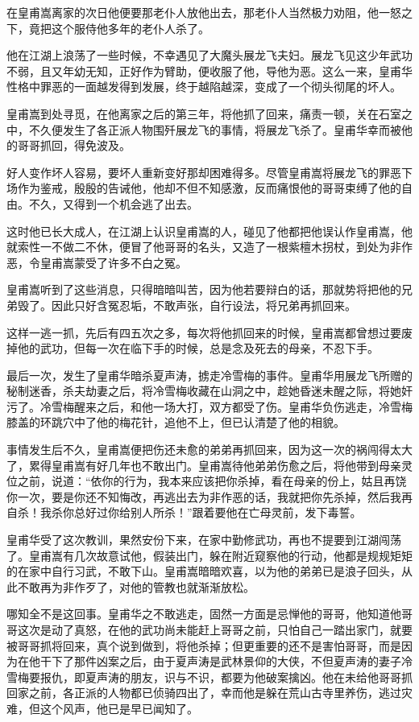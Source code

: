 \documentclass[12pt,oneside]{book}
\begin{document}
在皇甫嵩离家的次日他便要那老仆人放他出去，那老仆人当然极力劝阻，他一怒之下，竟把这个服侍他多年的老仆人杀了。

他在江湖上浪荡了一些时候，不幸遇见了大魔头展龙飞夫妇。展龙飞见这少年武功不弱，且又年幼无知，正好作为臂助，便收服了他，导他为恶。这么一来，皇甫华性格中罪恶的一面越发得到发展，终于越陷越深，变成了一个彻头彻尾的坏人。

皇甫嵩到处寻觅，在他离家之后的第三年，将他抓了回来，痛责一顿，关在石室之中，不久便发生了各正派人物围歼展龙飞的事情，将展龙飞杀了。皇甫华幸而被他的哥哥抓回，得免波及。

好人变作坏人容易，要坏人重新变好那却困难得多。尽管皇甫嵩将展龙飞的罪恶下场作为鉴戒，殷殷的告诫他，他却不但不知感激，反而痛恨他的哥哥束缚了他的自由。不久，又得到一个机会逃了出去。

这时他已长大成人，在江湖上认识皇甫嵩的人，碰见了他都把他误认作皇甫嵩，他就索性一不做二不休，便冒了他哥哥的名头，又造了一根紫檀木拐杖，到处为非作恶，令皇甫嵩蒙受了许多不白之冤。

皇甫嵩听到了这些消息，只得暗暗叫苦，因为他若要辩白的话，那就势将把他的兄弟毁了。因此只好含冤忍垢，不敢声张，自行设法，将兄弟再抓回来。

这样一逃一抓，先后有四五次之多，每次将他抓回来的时候，皇甫嵩都曾想过要废掉他的武功，但每一次在临下手的时候，总是念及死去的母亲，不忍下手。

最后一次，发生了皇甫华暗杀夏声涛，掳走冷雪梅的事件。皇甫华用展龙飞所赠的秘制迷香，杀夫劫妻之后，将冷雪梅收藏在山洞之中，趁她昏迷未醒之际，将她奸污了。冷雪梅醒来之后，和他一场大打，双方都受了伤。皇甫华负伤逃走，冷雪梅膝盖的环跳穴中了他的梅花针，追他不上，但已认清楚了他的相貌。

事情发生后不久，皇甫嵩便把伤还未愈的弟弟再抓回来，因为这一次的祸闯得太大了，累得皇甫嵩有好几年也不敢出门。皇甫嵩待他弟弟伤愈之后，将他带到母亲灵位之前，说道：``依你的行为，我本来应该把你杀掉，看在母亲的份上，姑且再饶你一次，要是你还不知悔改，再逃出去为非作恶的话，我就把你先杀掉，然后我再自杀！我杀你总好过你给别人所杀！''跟着要他在亡母灵前，发下毒誓。

皇甫华受了这次教训，果然安份下来，在家中勤修武功，再也不提要到江湖闯荡了。皇甫嵩有几次故意试他，假装出门，躲在附近窥察他的行动，他都是规规矩矩的在家中自行习武，不敢下山。皇甫嵩暗暗欢喜，以为他的弟弟已是浪子回头，从此不敢再为非作歹了，对他的管教也就渐渐放松。

哪知全不是这回事。皇甫华之不敢逃走，固然一方面是忌惮他的哥哥，他知道他哥哥这次是动了真怒，在他的武功尚未能赶上哥哥之前，只怕自己一踏出家门，就要被哥哥抓将回来，真个说到做到，将他杀掉；但更重要的还不是害怕哥哥，而是因为在他干下了那件凶案之后，由于夏声涛是武林景仰的大侠，不但夏声涛的妻子冷雪梅要报仇，即夏声涛的朋友，识与不识，都要为他破案擒凶。他在未给他哥哥抓回家之前，各正派的人物都已侦骑四出了，幸而他是躲在荒山古寺里养伤，逃过灾难，但这个风声，他已是早已闻知了。
\end{document}
